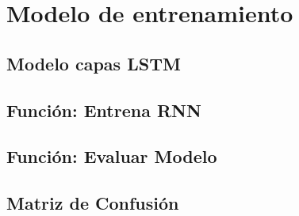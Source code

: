 \section{Modelo de entrenamiento}

\subsection{Modelo capas LSTM}



\subsection{Función: Entrena RNN}




\subsection{Función: Evaluar Modelo}



\subsection{Matriz de Confusión}
